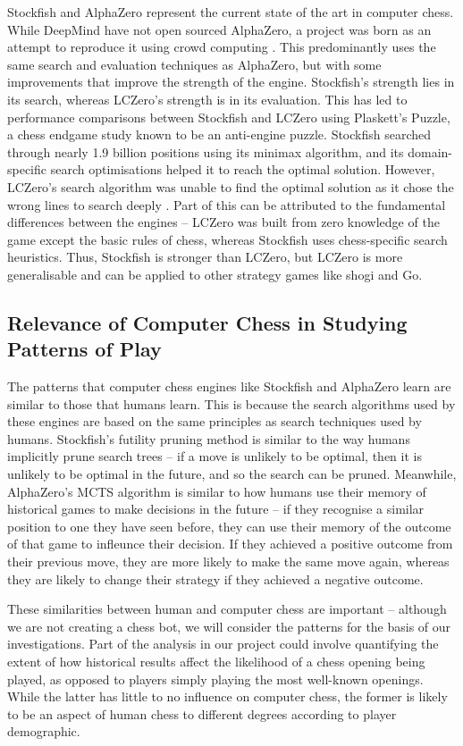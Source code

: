 \documentclass[%
 superscriptaddress,
showpacs,preprintnumbers,
 amsmath,
 amssymb,
 aps,
 pra,
showkeys,
onecolumn,
notitlepage,
11pt,
tightenlines      %
]{revtex4-1}
\begin{document}
Stockfish and AlphaZero represent the current state of the art in computer chess. While DeepMind have not open sourced AlphaZero, a project  was born as an attempt to reproduce it using crowd computing \cite{maharaj2022chess}. This predominantly uses the same search and evaluation techniques as AlphaZero, but with some improvements that improve the strength of the engine. Stockfish's strength lies in its search, whereas LCZero's strength is in its evaluation. This has led to performance comparisons between Stockfish and LCZero using Plaskett's Puzzle, a chess endgame study known to be an anti-engine puzzle. Stockfish searched through nearly 1.9 billion positions using its minimax algorithm, and its domain-specific search optimisations helped it to reach the optimal solution. However, LCZero's search algorithm was unable to find the optimal solution as it chose the wrong lines to search deeply \cite{maharaj2022chess}. Part of this can be attributed to the fundamental differences between the engines -- LCZero was built from zero knowledge of the game except the basic rules of chess, whereas Stockfish uses chess-specific search heuristics. Thus, Stockfish is stronger than LCZero, but LCZero is more generalisable and can be applied to other strategy games like shogi and Go.

\subsection{Relevance of Computer Chess in Studying Patterns of Play}
The patterns that computer chess engines like Stockfish and AlphaZero learn are similar to those that humans learn. This is because the search algorithms used by these engines are based on the same principles as search techniques used by humans. Stockfish's futility pruning method is similar to the way humans implicitly prune search trees -- if a move is unlikely to be optimal, then it is unlikely to be optimal in the future, and so the search can be pruned. Meanwhile, AlphaZero's MCTS algorithm is similar to how humans use their memory of historical games to make decisions in the future -- if they recognise a similar position to one they have seen before, they can use their memory of the outcome of that game to infleunce their decision. If they achieved a positive outcome from their previous move, they are more likely to make the same move again, whereas they are likely to change their strategy if they achieved a negative outcome.

These similarities between human and computer chess are important -- although we are not creating a chess bot, we will consider the patterns for the basis of our investigations. Part of the analysis in our project could involve quantifying the extent of how historical results affect the likelihood of a chess opening being played, as opposed to players simply playing the most well-known openings. While the latter has little to no influence on computer chess, the former is likely to be an aspect of human chess to different degrees according to player demographic.
\end{document}
